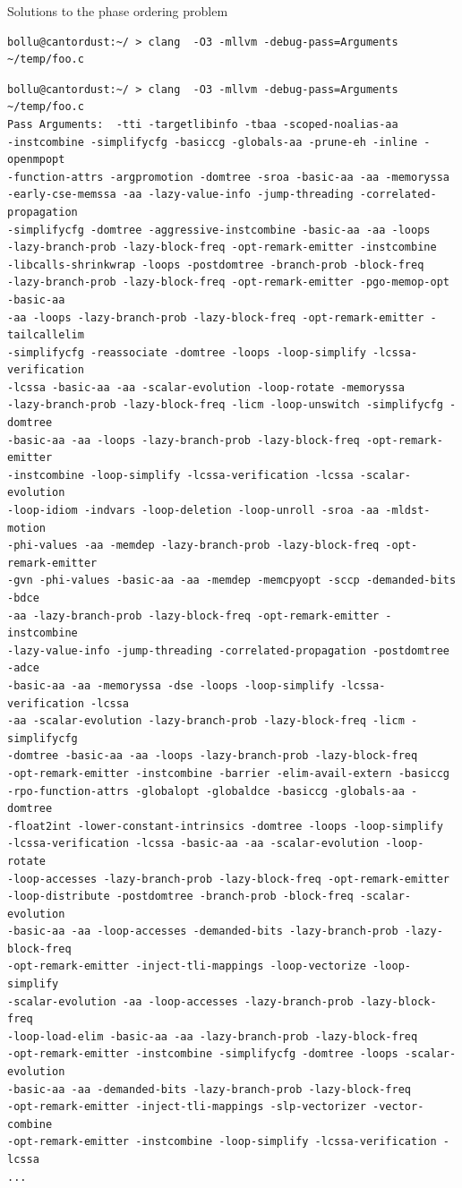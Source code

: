 \documentclass[8pt]{beamer}
\begin{document}
\begin{frame}[fragile]{Solutions to the phase ordering problem}
\begin{verbatim}
bollu@cantordust:~/ > clang  -O3 -mllvm -debug-pass=Arguments ~/temp/foo.c
\end{verbatim}
\begin{verbatim}
bollu@cantordust:~/ > clang  -O3 -mllvm -debug-pass=Arguments ~/temp/foo.c
Pass Arguments:  -tti -targetlibinfo -tbaa -scoped-noalias-aa
-instcombine -simplifycfg -basiccg -globals-aa -prune-eh -inline -openmpopt
-function-attrs -argpromotion -domtree -sroa -basic-aa -aa -memoryssa
-early-cse-memssa -aa -lazy-value-info -jump-threading -correlated-propagation
-simplifycfg -domtree -aggressive-instcombine -basic-aa -aa -loops
-lazy-branch-prob -lazy-block-freq -opt-remark-emitter -instcombine
-libcalls-shrinkwrap -loops -postdomtree -branch-prob -block-freq
-lazy-branch-prob -lazy-block-freq -opt-remark-emitter -pgo-memop-opt -basic-aa
-aa -loops -lazy-branch-prob -lazy-block-freq -opt-remark-emitter -tailcallelim
-simplifycfg -reassociate -domtree -loops -loop-simplify -lcssa-verification
-lcssa -basic-aa -aa -scalar-evolution -loop-rotate -memoryssa
-lazy-branch-prob -lazy-block-freq -licm -loop-unswitch -simplifycfg -domtree
-basic-aa -aa -loops -lazy-branch-prob -lazy-block-freq -opt-remark-emitter
-instcombine -loop-simplify -lcssa-verification -lcssa -scalar-evolution
-loop-idiom -indvars -loop-deletion -loop-unroll -sroa -aa -mldst-motion
-phi-values -aa -memdep -lazy-branch-prob -lazy-block-freq -opt-remark-emitter
-gvn -phi-values -basic-aa -aa -memdep -memcpyopt -sccp -demanded-bits -bdce
-aa -lazy-branch-prob -lazy-block-freq -opt-remark-emitter -instcombine
-lazy-value-info -jump-threading -correlated-propagation -postdomtree -adce
-basic-aa -aa -memoryssa -dse -loops -loop-simplify -lcssa-verification -lcssa
-aa -scalar-evolution -lazy-branch-prob -lazy-block-freq -licm -simplifycfg
-domtree -basic-aa -aa -loops -lazy-branch-prob -lazy-block-freq
-opt-remark-emitter -instcombine -barrier -elim-avail-extern -basiccg
-rpo-function-attrs -globalopt -globaldce -basiccg -globals-aa -domtree
-float2int -lower-constant-intrinsics -domtree -loops -loop-simplify
-lcssa-verification -lcssa -basic-aa -aa -scalar-evolution -loop-rotate
-loop-accesses -lazy-branch-prob -lazy-block-freq -opt-remark-emitter
-loop-distribute -postdomtree -branch-prob -block-freq -scalar-evolution
-basic-aa -aa -loop-accesses -demanded-bits -lazy-branch-prob -lazy-block-freq
-opt-remark-emitter -inject-tli-mappings -loop-vectorize -loop-simplify
-scalar-evolution -aa -loop-accesses -lazy-branch-prob -lazy-block-freq
-loop-load-elim -basic-aa -aa -lazy-branch-prob -lazy-block-freq
-opt-remark-emitter -instcombine -simplifycfg -domtree -loops -scalar-evolution
-basic-aa -aa -demanded-bits -lazy-branch-prob -lazy-block-freq
-opt-remark-emitter -inject-tli-mappings -slp-vectorizer -vector-combine
-opt-remark-emitter -instcombine -loop-simplify -lcssa-verification -lcssa
...
\end{verbatim}
\end{frame}
\end{document}
